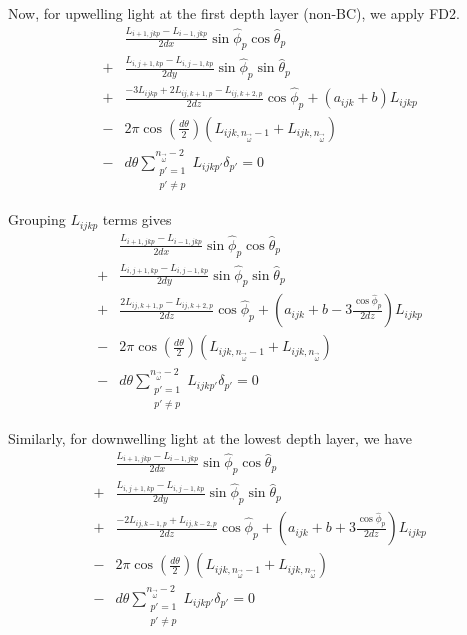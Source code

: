 Now, for upwelling light at the first depth layer (non-BC), we apply FD2.
\begin{equation}
  \begin{aligned}
    &\frac{L_{i+1,jkp}-L_{i-1,jkp}}{2dx}\sin\hat{\phi}_p\cos\hat{\theta}_p \\
    + &\frac{L_{i,j+1,kp}-L_{i,j-1,kp}}{2dy}\sin\hat{\phi}_p\sin\hat{\theta}_p \\
    + &\frac{-3L_{ijkp} + 2L_{ij,k+1,p} - L_{ij,k+2,p}}{2dz}\cos\hat{\phi}_p + (a_{ijk}+b)L_{ijkp} \\
    - &2\pi\cos\left( \frac{d\theta}{2} \right)(L_{ijk,n_{\vec{\omega}}-1}+L_{ijk,n_{\vec{\omega}}}) \\
    - &d\theta \sum_{\substack{p'=1 \\ p' \neq p}}^{n_{\vec{\omega}}-2} L_{ijkp'}\delta_{p'} = 0
  \end{aligned}
\end{equation}

Grouping $L_{ijkp}$ terms gives
\begin{equation}
  \begin{aligned}
    &\frac{L_{i+1,jkp}-L_{i-1,jkp}}{2dx}\sin\hat{\phi}_p\cos\hat{\theta}_p \\
    + &\frac{L_{i,j+1,kp}-L_{i,j-1,kp}}{2dy}\sin\hat{\phi}_p\sin\hat{\theta}_p \\
    + &\frac{2L_{ij,k+1,p} - L_{ij,k+2,p}}{2dz}\cos\hat{\phi}_p + \left(a_{ijk}+b - 3\frac{\cos\hat\phi_p}{2dz} \right)L_{ijkp} \\
    - &2\pi\cos\left( \frac{d\theta}{2} \right)(L_{ijk,n_{\vec{\omega}}-1}+L_{ijk,n_{\vec{\omega}}}) \\
    - &d\theta \sum_{\substack{p'=1 \\ p' \neq p}}^{n_{\vec{\omega}}-2} L_{ijkp'}\delta_{p'} = 0
  \end{aligned}
\end{equation}

Similarly, for downwelling light at the lowest depth layer, we have
\begin{equation}
  \begin{aligned}
    &\frac{L_{i+1,jkp}-L_{i-1,jkp}}{2dx}\sin\hat{\phi}_p\cos\hat{\theta}_p \\
    + &\frac{L_{i,j+1,kp}-L_{i,j-1,kp}}{2dy}\sin\hat{\phi}_p\sin\hat{\theta}_p \\
    + &\frac{-2L_{ij,k-1,p} + L_{ij,k-2,p}}{2dz}\cos\hat{\phi}_p + \left(a_{ijk}+b + 3\frac{\cos\hat\phi_p}{2dz} \right)L_{ijkp} \\
    - &2\pi\cos\left( \frac{d\theta}{2} \right)(L_{ijk,n_{\vec{\omega}}-1}+L_{ijk,n_{\vec{\omega}}}) \\
    - &d\theta \sum_{\substack{p'=1 \\ p' \neq p}}^{n_{\vec{\omega}}-2} L_{ijkp'}\delta_{p'} = 0
  \end{aligned}
\end{equation}

